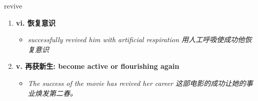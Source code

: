 
\begin{frame}
{\huge revive}
\begin{center}
\begin{enumerate}\Large
  \item \textbf{vi. 恢复意识}
  \begin{itemize}
    \item \em{\Large{successfully revived him with artificial respiration 用人工呼吸使成功他恢复意识}}
  \end{itemize}
  \item \textbf{v. 再获新生: become active or flourishing again}
  \begin{itemize}
    \item \em{\Large{The success of the movie has revived her career 这部电影的成功让她的事业焕发第二春。}}
  \end{itemize}
\end{enumerate}
\end{center}
\end{frame}
